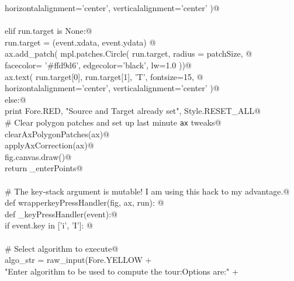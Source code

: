 \documentclass[10pt, english, oneside]{report}
\begin{document}
\begin{appendices}
\begin{flushleft}
\begin{list}{}{}
\mbox{}\verb@                               horizontalalignment='center', verticalalignment='center' )@\\
\mbox{}\verb@@\\
\mbox{}\verb@                 elif run.target is None:@\\
\mbox{}\verb@                      run.target = (event.xdata, event.ydata)  @\\
\mbox{}\verb@                      ax.add_patch( mpl.patches.Circle( run.target, radius = patchSize, @\\
\mbox{}\verb@                                                       facecolor= '#ffd9d6', edgecolor='black', lw=1.0 ))@\\
\mbox{}\verb@                      ax.text( run.target[0], run.target[1], 'T', fontsize=15, @\\
\mbox{}\verb@                               horizontalalignment='center', verticalalignment='center' )@\\
\mbox{}\verb@                 else:@\\
\mbox{}\verb@                       print Fore.RED, "Source and Target already set", Style.RESET_ALL@\\
\mbox{}\verb@             # Clear polygon patches and set up last minute \verb|ax| tweaks@\\
\mbox{}\verb@             clearAxPolygonPatches(ax)@\\
\mbox{}\verb@             applyAxCorrection(ax)@\\
\mbox{}\verb@             fig.canvas.draw()@\\
\mbox{}\verb@      return _enterPoints@\\
\mbox{}\verb@@\\
\mbox{}\verb@    # The key-stack argument is mutable! I am using this hack to my advantage.@\\
\mbox{}\verb@    def wrapperkeyPressHandler(fig, ax, run): @\\
\mbox{}\verb@           def _keyPressHandler(event):@\\
\mbox{}\verb@               if event.key in ['i', 'I']:  @\\
\mbox{}\verb@@\\
\mbox{}\verb@                    # Select algorithm to execute@\\
\mbox{}\verb@                    algo_str = raw_input(Fore.YELLOW                                             +\@\\
\mbox{}\verb@                            "Enter algorithm to be used to compute the tour:\n Options are:\n"   +\@\\

\end{list}
\end{flushleft}
\end{appendices}
\end{document}

